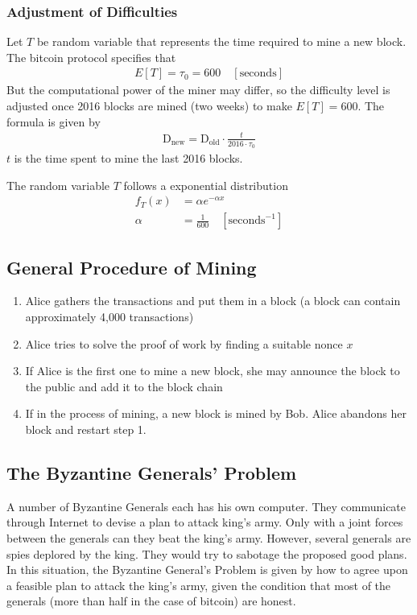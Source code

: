 \documentclass[12pt,a4paper]{article}
\begin{document}
\subsubsection{Adjustment of Difficulties}
Let $T$ be random variable that represents the time required to mine a new block. The bitcoin protocol specifies that 
\begin{align*}
E[T] = \tau_0 = 600 \quad [\text{seconds}]
\end{align*}
But the computational power of the miner may differ, so the difficulty level is adjusted once 2016 blocks are mined (two weeks) to make $E[T] = 600 $. The formula is given by 
\begin{align*}
\text{D}_{\text{new}} = \text{D}_{\text{old}} \cdot \frac{t}{2016\cdot \tau_0}
\end{align*}
$t$ is the time spent to mine the last 2016 blocks. 


The random variable $T$ follows a exponential distribution 
\begin{align*}
f_T(x) &= \alpha e^{-\alpha x} \\
\alpha & = \frac{1}{600} \quad [\text{seconds}^{-1}]
\end{align*}
\subsection{General Procedure of Mining}
\begin{enumerate}
	\item Alice gathers the transactions and put them in a block (a block can contain approximately 4,000 transactions)
	\item Alice tries to solve the proof of work by finding a suitable nonce $x$
	\item If Alice is the first one to mine a new block, she may announce the block to the public and add it to the block chain
	\item If in the process of mining, a new block is mined by Bob. Alice abandons her block and restart step 1.
\end{enumerate}
\subsection{The Byzantine Generals' Problem}
A number of Byzantine Generals each has his own computer. They communicate through Internet to devise a plan to attack king's army. Only with a joint forces between the generals can they beat the king's army. However, several generals are spies deplored by the king. They would try to sabotage the proposed good plans. In this situation, the Byzantine General's Problem is given by how to agree upon a feasible plan to attack the king's army, given the condition that most of the generals (more than half in the case of bitcoin) are honest.
\end{document}
